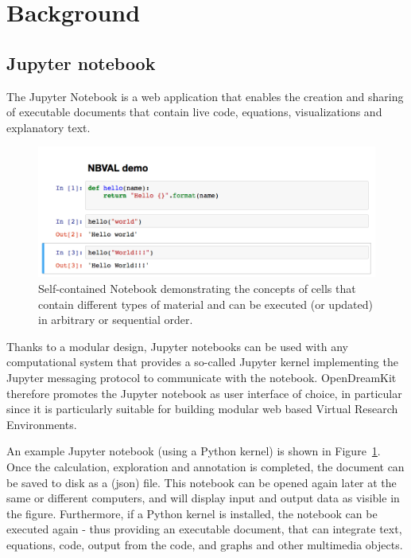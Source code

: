 \documentclass{deliverablereport}
\author{Martin Sandve Aln\ae{}s \& Hans Fangohr \& Vidar Fauske \& Thomas Kluyver \& Benjamin Ragan-Kelley \& MORE?}
\begin{document}
\maketitle
\strut\githubissuedescription
\newpage\tableofcontents\newpage

\newcommand{\nbval}{\texttt{nbval} }

\section{Background} %

\subsection{Jupyter notebook}
The Jupyter Notebook is a web application that enables the creation
and sharing of executable documents that contain live code,
equations, visualizations and explanatory text.


\begin{figure}
\centerline{\includegraphics[width=1.0\textwidth]{examples/demo.png}}
\caption{\label{fig:jupyterdemo} Self-contained \Jupyter Notebook
  demonstrating the concepts of cells that contain different types of
  material and can be executed (or updated) in arbitrary or sequential
  order.}
\end{figure}

Thanks to a modular design, Jupyter notebooks can be used with any
computational system that provides a so-called Jupyter kernel
implementing the Jupyter messaging protocol to communicate with the
notebook. OpenDreamKit therefore promotes the Jupyter notebook as user
interface of choice, in particular since it is particularly suitable
for building modular web based Virtual Research Environments.

An example Jupyter notebook (using a Python kernel) is shown in
Figure~\ref{fig:jupyterdemo}. Once the calculation, exploration and
annotation is completed, the document can be saved to disk as a (json)
file. This notebook can be opened again later at the same or different
computers, and will display input and output data as visible in the
figure. Furthermore, if a Python kernel is installed, the notebook can
be executed again  - thus providing an executable document, that
can integrate text, equations, code, output from the code, and graphs and
other multimedia objects.
\end{document}
